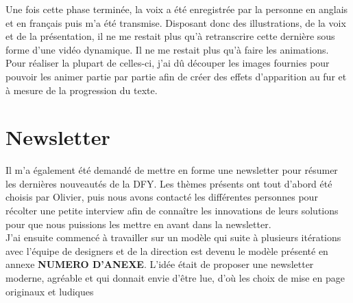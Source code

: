 Une fois cette phase terminée, la voix a été enregistrée par la personne en anglais et en français puis m'a été transmise. Disposant donc des illustrations, de la voix et de la présentation, il ne me restait plus qu'à retranscrire cette dernière sous forme d'une vidéo dynamique. Il ne me restait plus qu'à faire les animations. Pour réaliser la plupart de  celles-ci, j'ai dû découper les images fournies pour pouvoir les animer partie par partie afin de créer des effets d'apparition au fur et à mesure de la progression du texte. 


\section{Newsletter}

Il m'a également été demandé de mettre en forme une newsletter pour résumer les dernières nouveautés de la DFY. Les thèmes présents ont tout d'abord été choisis par Olivier, puis nous avons contacté les différentes personnes pour récolter une petite interview afin de connaître les innovations de leurs solutions pour que nous puissions les mettre en avant dans la newsletter.\\

J'ai ensuite commencé à travailler sur un modèle qui suite à plusieurs itérations avec l'équipe de designers et de la direction est devenu le modèle présenté en annexe \textbf{NUMERO D'ANEXE}. L'idée était de proposer une newsletter moderne, agréable et qui donnait envie d'être lue, d'où les choix de mise en page originaux et ludiques



